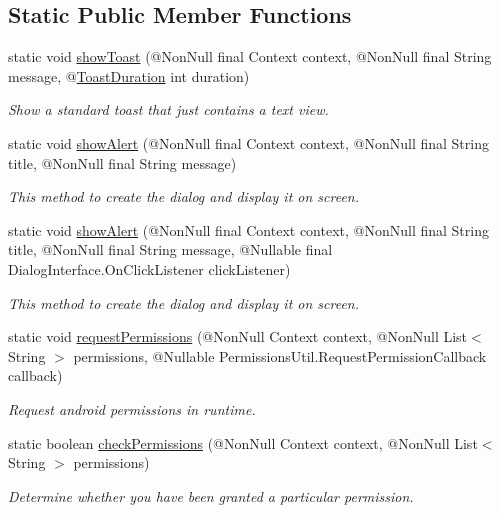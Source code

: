\subsection*{Static Public Member Functions}
\begin{DoxyCompactItemize}
\item 
static void \hyperlink{classcom_1_1toast_1_1android_1_1gamebase_1_1_gamebase_1_1_util_ab4467be73dd7910139d8135348ac00ae}{show\+Toast} (@Non\+Null final Context context, @Non\+Null final String message, @\hyperlink{interfacecom_1_1toast_1_1android_1_1gamebase_1_1base_1_1annotation_1_1_toast_duration}{Toast\+Duration} int duration)
\begin{DoxyCompactList}\small\item\em Show a standard toast that just contains a text view. \end{DoxyCompactList}\item 
static void \hyperlink{classcom_1_1toast_1_1android_1_1gamebase_1_1_gamebase_1_1_util_a7a8c03323f6a593e4eb765b41de2ea82}{show\+Alert} (@Non\+Null final Context context, @Non\+Null final String title, @Non\+Null final String message)
\begin{DoxyCompactList}\small\item\em This method to create the dialog and display it on screen. \end{DoxyCompactList}\item 
static void \hyperlink{classcom_1_1toast_1_1android_1_1gamebase_1_1_gamebase_1_1_util_aeb1c44c193356f6050710b7f50e41a6b}{show\+Alert} (@Non\+Null final Context context, @Non\+Null final String title, @Non\+Null final String message, @Nullable final Dialog\+Interface.\+On\+Click\+Listener click\+Listener)
\begin{DoxyCompactList}\small\item\em This method to create the dialog and display it on screen. \end{DoxyCompactList}\item 
static void \hyperlink{classcom_1_1toast_1_1android_1_1gamebase_1_1_gamebase_1_1_util_afa6d3ce6e5b0a271f6d120e6b616f97c}{request\+Permissions} (@Non\+Null Context context, @Non\+Null List$<$ String $>$ permissions, @Nullable Permissions\+Util.\+Request\+Permission\+Callback callback)
\begin{DoxyCompactList}\small\item\em Request android permissions in runtime. \end{DoxyCompactList}\item 
static boolean \hyperlink{classcom_1_1toast_1_1android_1_1gamebase_1_1_gamebase_1_1_util_ae5164823a25529a8125f7cf5f974c609}{check\+Permissions} (@Non\+Null Context context, @Non\+Null List$<$ String $>$ permissions)
\begin{DoxyCompactList}\small\item\em Determine whether {\itshape you} have been granted a particular permission. \end{DoxyCompactList}\end{DoxyCompactItemize}


